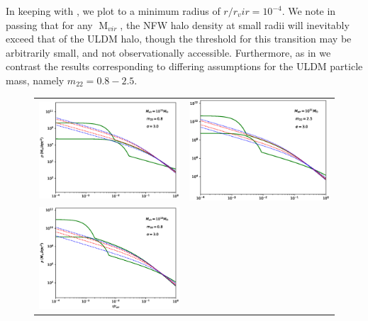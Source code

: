 \documentclass[a4paper,11pt]{article}
\begin{document}
In keeping with \cite{Robles:2018fur}, we plot to a minimum radius of $r/r_vir = 10^{-4}$. We note in passing that for any $\operatorname{M}_{vir}$, the NFW halo density at small radii will inevitably exceed that of the ULDM halo, though the threshold for this transition may be arbitrarily small, and not observationally accessible. Furthermore, as in \cite{Robles:2018fur} we contrast the  results corresponding to differing assumptions for the ULDM particle mass, namely $m_{22} = 0.8 - 2.5$.



\begin{figure}
\begin{tabular}{cc}
{\includegraphics[width = 3.1in, trim={2.1cm 0.5cm 0cm 0.5cm}]{pics/11_8_3.eps}} &
{\includegraphics[width = 3.1in, trim={2.1cm 0.5cm 0cm 0.5cm}]{pics/11_25_3.eps}}\\
{\includegraphics[width = 3.1in, trim={2.1cm 0.5cm 0cm 0.5cm}]{pics/12_8_3.eps}} &

\end{tabular}
\end{figure}
\end{document}
